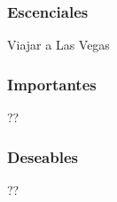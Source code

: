 \subsubsection{Escenciales}
\begin{description}
\item[Viajar a Las Vegas]

\end{description}


\subsubsection{Importantes}
\begin{description}
\item[??]
\end{description}


\subsubsection{Deseables}
\begin{description}
\item[??]
\end{description}

